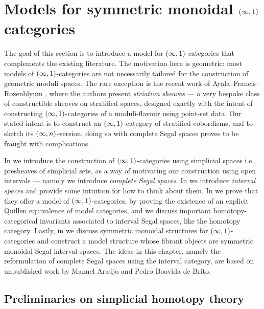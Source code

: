 

\chapter{Models for symmetric monoidal \texorpdfstring{$(\operatorname{\infty},1)$}-categories}
\label{ch2:: title}

The goal of this section is to introduce a model for $(\operatorname{\infty},1)$-categories that complements the existing literature. The motivation here is geometric: most models of $(\operatorname{\infty},1)$-categories are not necessarily tailored for the construction of geometric moduli spaces. The rare exception is the recent work of Ayala--Francis--Rozenblyum \cite{AFR1}, where the authors present \emph{striation sheaves} — a very bespoke class of constructible sheaves on stratified spaces, designed exactly with the intent of constructing $(\operatorname{\infty},1)$-categories of a moduli-flavour using point-set data. Our stated intent is to construct an $(\operatorname{\infty},1)$-category of stratified cobordisms, and to sketch its $(\operatorname{\infty},n)$-version; doing so with complete Segal spaces proves to be fraught with complications.


In  we introduce the construction of $(\operatorname{\infty},1)$-categories using simplicial spaces i.e., presheaves of simplicial sets, as a way of motivating our construction using open intervals — namely we introduce \emph{complete Segal spaces}.  In  we introduce \emph{interval spaces} and provide some intuition for how to think about them. In  we prove that they offer a model of $(\operatorname{\infty},1)$-categories, by proving the existence of an explicit Quillen equivalence of model categories, and we discuss important homotopy-categorical invariants associated to interval Segal spaces, like the homotopy category. Lastly, in  we discuss symmetric monoidal structures for $(\operatorname{\infty},1)$-categories and construct a model structure whose fibrant objects are symmetric monoidal Segal interval spaces. The ideas in this chapter, namely the reformulation of complete Segal spaces using the interval category, are based on unpublished work by Manuel Araújo and Pedro Boavida de Brito.

\section{Preliminaries on simplicial homotopy theory}
\label{ch2:: sec: preliminaries on simplicial homotopy theory}

